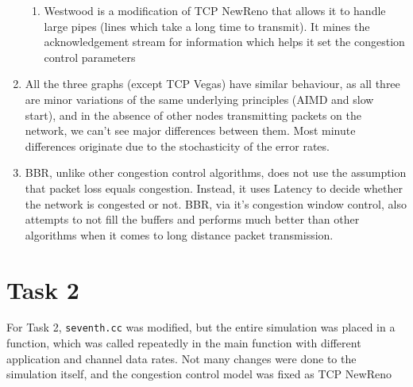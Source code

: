 \documentclass[12pt]{article}
\begin{document}
\begin{enumerate}
\begin{enumerate}[label=(\alph*)]
        \item Westwood is a modification of TCP NewReno that allows it to handle 
        large pipes (lines which take a long time to transmit). It mines the 
        acknowledgement stream for information which helps it set the congestion 
        control parameters
        \begin{center}
        \end{center}
    \end{enumerate}

\item All the three graphs (except TCP Vegas) have similar behaviour, as all 
    three are minor variations of the same underlying principles (AIMD and slow
    start), and in the absence of other nodes transmitting packets on the 
    network, we can't see major differences between them. Most minute differences 
    originate due to the stochasticity of the error rates.

\item BBR, unlike other congestion control algorithms, does not use the 
    assumption that packet loss equals congestion. Instead, it uses Latency to
    decide whether the network is congested or not. BBR, via it's congestion 
    window control, also attempts to not fill the buffers and performs much 
    better than other algorithms when it comes to long distance packet transmission.
        
\end{enumerate}

\section*{Task 2}

For Task 2, \texttt{seventh.cc} was modified, but the entire simulation was 
placed in a function, which was called repeatedly in the main function with 
different application and channel data rates. Not many changes were done to 
the simulation itself, and the congestion control model was fixed as TCP NewReno
\end{document}
